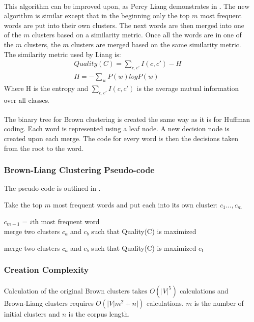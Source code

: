 \paragraph{}
This algorithm can be improved upon, as Percy Liang demonstrates in \cite{Liang2005}. The new algorithm is similar except that in the beginning only the top $m$ most frequent words are put into their own clusters. The next words are then merged into one of the $m$ clusters based on a similarity metric. Once all the words are in one of the $m$ clusters, the $m$ clusters are merged based on the same similarity metric.
The similarity metric used by Liang is:
\begin{align}
Quality(C) = \sum_{c,c'} I(c,c') - H
\\
H= -\sum_w P(w)logP(w) \nonumber
\end{align}
Where H is the entropy and $\sum_{c,c'} I(c,c')$ is the average mutual information over all classes.
\paragraph{}
The binary tree for Brown clustering is created the same way as it is for Huffman coding. Each word is represented using a leaf node. A new decision node is created upon each merge. The code for every word is then the decisions taken from the root to the word.

\subsubsection{Brown-Liang Clustering Pseudo-code}
The pseudo-code is outlined in \cite{Collins2011}.
\begin{algorithm}
\SetAlgoLined
Take the top $m$ most frequent words and put each into its own cluster: $c_1\dots,c_m$

 {
	$c_{m+1}$ = $i$th most frequent word
	\\
	merge two clusters $c_a$ and $c_b$ such that Quality(C) is maximized
	
}
 {
merge two clusters $c_a$ and $c_b$ such that Quality(C) is maximized
}
\Return $c_1$
\end{algorithm}

\subsubsection{Creation Complexity}
\paragraph{}
Calculation of the original Brown clusters takes $O(|V|^5)$ calculations and Brown-Liang clusters requires $O(|V| m^2+n|)$ calculations. $m$ is the number of initial clusters and $n$ is the corpus length.  

